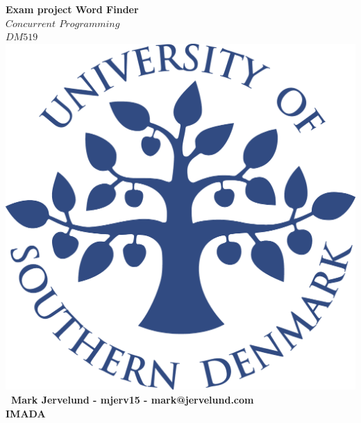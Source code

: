 \documentclass[a4paper,10pt,titlepage]{report}
\date{}
\begin{document}
\begin{titlepage}
\centering
    \vspace*{2\baselineskip}
    \huge
    \bfseries
    Exam project Word Finder \\

    \normalfont
	\huge
     \(Concurrent\)  \(Programming\) \\ \( DM519\)  \\ [3\baselineskip]
    \normalfont
	\includegraphics[scale=0.2]{SDU_logo}\\
	 
	
        \vfill\
    Mark Jervelund - mjerv15 - mark@jervelund.com \\
    \vspace{10mm}
    IMADA \\
    \vspace{5mm}
    \textbf{\datedate}  \bf{} \\[2\baselineskip]
\end{titlepage}
\newpage
\renewcommand{\thepage}{\roman{page}}%
\tableofcontents

\newpage
\setcounter{page}{1}
\renewcommand{\thepage}{\arabic{page}}
\end{document}
